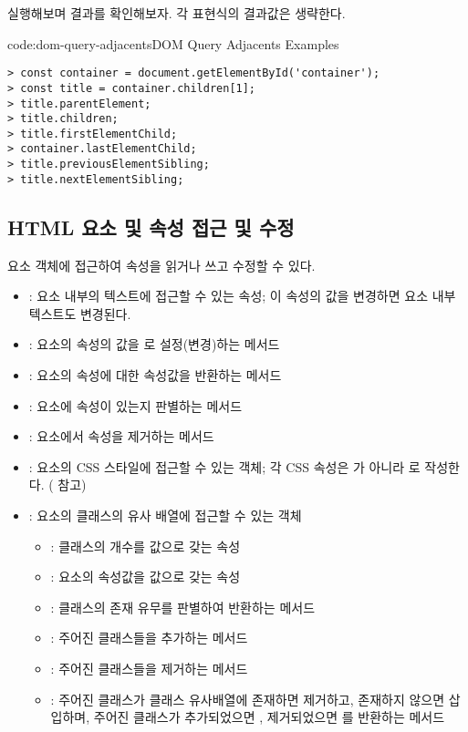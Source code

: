 \를 실행해보며 결과를 확인해보자. 각 표현식의 결과값은 생략한다.

\begin{codeenv}{code:dom-query-adjacents}{DOM Query Adjacents Examples}\begin{verbatim}
> const container = document.getElementById('container');
> const title = container.children[1];
> title.parentElement;
> title.children;
> title.firstElementChild;
> container.lastElementChild;
> title.previousElementSibling;
> title.nextElementSibling;
\end{verbatim}
\end{codeenv}

\subsection*{HTML 요소 및 속성 접근 및 수정}

요소 객체에 접근하여 속성을 읽거나 쓰고 수정할 수 있다.

\begin{itemize}
    \item {}: 요소 내부의 텍스트에 접근할 수 있는 속성; 이 속성의 값을 변경하면 요소 내부 텍스트도 변경된다.
    \item {}: 요소의  속성의 값을 로 설정(변경)하는 메서드
    \item {}: 요소의  속성에 대한 속성값을 반환하는 메서드
    \item {}: 요소에  속성이 있는지 판별하는 메서드
    \item {}: 요소에서  속성을 제거하는 메서드
    \item {}: 요소의 CSS 스타일에 접근할 수 있는 객체; 각 CSS 속성은 가 아니라 로 작성한다. ( 참고)

    \item {}: 요소의 클래스의 유사 배열에 접근할 수 있는 객체
    \begin{itemize}
      \item {}: 클래스의 개수를 값으로 갖는 속성
      \item {}: 요소의  속성값을 값으로 갖는 속성
      \item {}: 클래스의 존재 유무를 판별하여 반환하는 메서드
      \item {}: 주어진 클래스들을 추가하는 메서드
      \item {}: 주어진 클래스들을 제거하는 메서드
      \item {}: 주어진 클래스가 클래스 유사배열에 존재하면 제거하고, 존재하지 않으면 삽입하며, 주어진 클래스가 추가되었으면 , 제거되었으면 를 반환하는 메서드
    \end{itemize}
\end{itemize}

